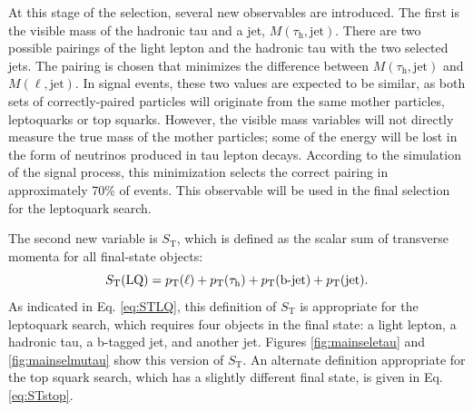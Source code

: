 \documentclass[12pt]{thesis}  %
\newcommand{\tauh}{\ensuremath{\tau_{\text{h}}}\xspace}
\def\ST{\ensuremath{S_{\text{T}}}\xspace}
\def\MassTJ{\ensuremath{M(\tauh,\text{jet})}\xspace}
\def\MassLJ{\ensuremath{M(\ell,\text{jet})}\xspace}
\begin{document}
At this stage of the selection, several new observables are introduced. The first is the visible mass of the hadronic tau and a jet, \MassTJ. There are two possible pairings of the light lepton and the hadronic tau with the two selected jets. The pairing is chosen that minimizes the difference between \MassTJ and \MassLJ. In signal events, these two values are expected to be similar, as both sets of correctly-paired particles will originate from the same mother particles, leptoquarks or top squarks. However, the visible mass variables will not directly measure the true mass of the mother particles; some of the energy will be lost in the form of neutrinos produced in tau lepton decays. According to the simulation of the signal process, this minimization selects the correct pairing in approximately 70\% of events. This observable will be used in the final selection for the leptoquark search.

The second new variable is \ST, which is defined as the scalar sum of transverse momenta for all final-state objects:
\begin{equation}
\label{eq:STLQ}
\ST(\text{LQ}) = \pt(\ell) + \pt(\tauh) + \pt(\text{b-jet}) + \pt(\text{jet}).
\end{equation}
As indicated in Eq. \eqref{eq:STLQ}, this definition of \ST is appropriate for the leptoquark search, which requires four objects in the final state: a light lepton, a hadronic tau, a b-tagged jet, and another jet. Figures \ref{fig:mainseletau} and \ref{fig:mainselmutau} show this version of \ST. An alternate definition appropriate for the top squark search, which has a slightly different final state, is given in Eq. \eqref{eq:STstop}.
\end{document}
